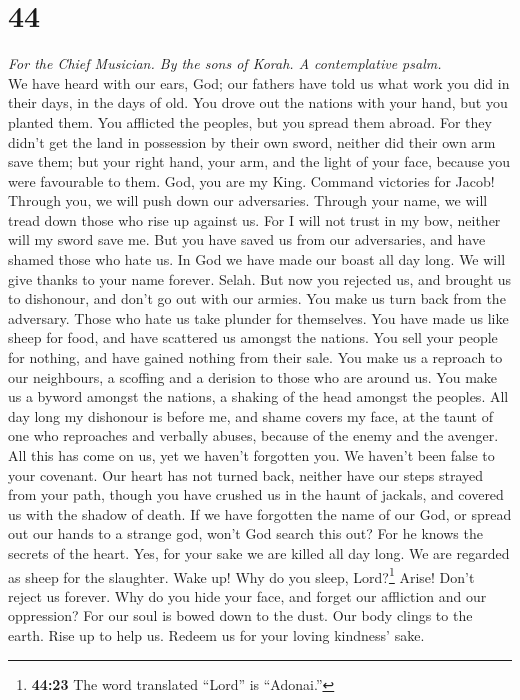 \hypertarget{section-43}{%
\section{44}\label{section-43}}

\emph{For the Chief Musician. By the sons of Korah. A contemplative
psalm.}\\
 We have heard with our ears, God; our fathers have told
us what work you did in their days, in the days of old. 
You drove out the nations with your hand, but you planted them. You
afflicted the peoples, but you spread them abroad.  For
they didn't get the land in possession by their own sword, neither did
their own arm save them; but your right hand, your arm, and the light of
your face, because you were favourable to them.  God, you
are my King. Command victories for Jacob!  Through you, we
will push down our adversaries. Through your name, we will tread down
those who rise up against us.  For I will not trust in my
bow, neither will my sword save me.  But you have saved us
from our adversaries, and have shamed those who hate us. 
In God we have made our boast all day long. We will give thanks to your
name forever. Selah.  But now you rejected us, and brought
us to dishonour, and don't go out with our armies.  You
make us turn back from the adversary. Those who hate us take plunder for
themselves.  You have made us like sheep for food, and
have scattered us amongst the nations.  You sell your
people for nothing, and have gained nothing from their sale.
 You make us a reproach to our neighbours, a scoffing and
a derision to those who are around us.  You make us a
byword amongst the nations, a shaking of the head amongst the peoples.
 All day long my dishonour is before me, and shame covers
my face,  at the taunt of one who reproaches and verbally
abuses, because of the enemy and the avenger.  All this
has come on us, yet we haven't forgotten you. We haven't been false to
your covenant.  Our heart has not turned back, neither
have our steps strayed from your path,  though you have
crushed us in the haunt of jackals, and covered us with the shadow of
death.  If we have forgotten the name of our God, or
spread out our hands to a strange god,  won't God search
this out? For he knows the secrets of the heart.  Yes,
for your sake we are killed all day long. We are regarded as sheep for
the slaughter.  Wake up! Why do you sleep,
Lord?\footnote{\textbf{44:23} The word translated ``Lord'' is
  ``Adonai.''} Arise! Don't reject us forever.  Why do
you hide your face, and forget our affliction and our oppression?
 For our soul is bowed down to the dust. Our body clings
to the earth.  Rise up to help us. Redeem us for your
loving kindness' sake.

